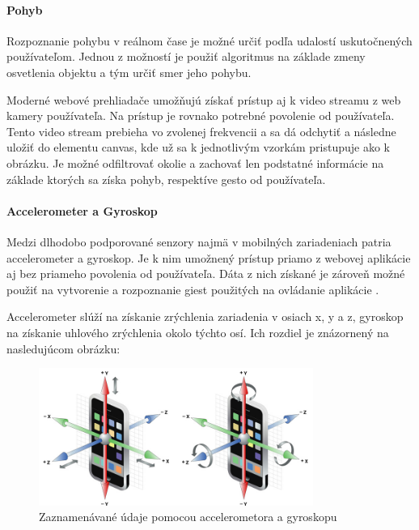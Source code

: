 \newpage
\paragraph{Pohyb} %

Rozpoznanie pohybu v reálnom čase je možné určiť podľa udalostí uskutočnených používateľom. Jednou z možností je použiť algoritmus na základe zmeny osvetlenia objektu \cite{MotionIllumination} a tým určiť smer jeho pohybu.

Moderné webové prehliadače umožňujú získať prístup aj k video streamu z web kamery používateľa. Na prístup je rovnako potrebné povolenie od používateľa. Tento video stream prebieha vo zvolenej frekvencii a sa dá odchytiť a následne uložiť do elementu canvas, kde už sa k jednotlivým vzorkám pristupuje ako k obrázku. Je možné odfiltrovať okolie a zachovať len podstatné informácie na základe ktorých sa získa pohyb, respektíve gesto od používateľa.


\paragraph{Accelerometer a Gyroskop} %

Medzi dlhodobo podporované senzory najmä v mobilných zariadeniach patria accelerometer a gyroskop. Je k nim umožnený prístup priamo z webovej aplikácie aj bez priameho povolenia od používateľa. Dáta z nich získané je zároveň možné použiť na vytvorenie a rozpoznanie giest použitých na ovládanie aplikácie \cite{AccelerationAndGyroscope}.

Accelerometer slúží na získanie zrýchlenia zariadenia v osiach x, y a z, gyroskop na získanie uhlového zrýchlenia okolo týchto osí. Ich rozdiel je znázornený na nasledujúcom obrázku:

\begin{figure}[H]
  \centering
  \includegraphics[width=0.8\textwidth]{img/accvsgyro.png}
  \caption[Accelerometor a gyroskop]{
    Zaznamenávané údaje pomocou accelerometora a gyroskopu}
  \label{fig: tnavlaptops}
\end{figure}

